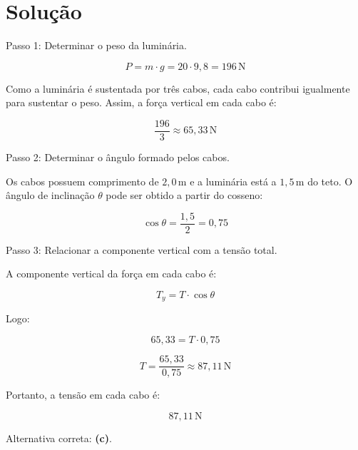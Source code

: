 \documentclass[a4paper,12pt]{article}
\newcommand{\printingbibliography}{%

    \pagestyle{myheadings}
    \markright{}
    \sloppy
    \printbibliography[heading=bibintoc, %
                   title=Refer\^encias %
                  ]
    \fussy%
}
\begin{document}
\section*{Solução}

Passo 1: Determinar o peso da luminária.

\[
P = m \cdot g = 20 \cdot 9,8 = 196 \, \mathrm{N}
\]

Como a luminária é sustentada por três cabos, cada cabo contribui igualmente para sustentar o peso. Assim, a força vertical em cada cabo é:

\[
\frac{196}{3} \approx 65,33 \, \mathrm{N}
\]

\bigskip
Passo 2: Determinar o ângulo formado pelos cabos.

Os cabos possuem comprimento de \(2,0 \, \mathrm{m}\) e a luminária está a \(1,5 \, \mathrm{m}\) do teto. O ângulo de inclinação \(\theta\) pode ser obtido a partir do cosseno:

\newpage
{}

\[
\cos \theta = \frac{1,5}{2} = 0,75
\]

\bigskip
Passo 3: Relacionar a componente vertical com a tensão total.

A componente vertical da força em cada cabo é:

\[
T_y = T \cdot \cos \theta
\]

Logo:

\[
65,33 = T \cdot 0,75
\]

\[
T = \frac{65,33}{0,75} \approx 87,11 \, \mathrm{N}
\]

\bigskip
\noindent
Portanto, a tensão em cada cabo é:

\[
\boxed{87,11 \, \mathrm{N}}
\]

\bigskip
\noindent
Alternativa correta: \textbf{(c)}.

\end{document}
